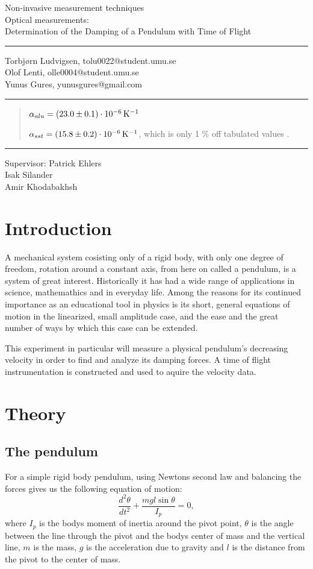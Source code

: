 \documentclass[11pt, a4paper]{article}
\date{\todayswe}
\makeatletter
\def\contacts{Torbjørn Ludvigsen, tolu0022@student.umu.se\\Olof Lenti, olle0004@student.umu.se\\
Yunus Gures, yunusgures@gmail.com}
\def\course{Non-invasive measurement techniques}
\def\lab{Optical measurements:\\Determination of the Damping of a Pendulum with Time of Flight}
\def\supervisors{Patrick Ehlers\\Isak Silander\\ Amir Khodabakhsh}
\makeatother
\begin{document}
\pagestyle{fancy}
\begin{titlepage}
	\begin{center}
		\course\\
		\Large{\lab}\vspace{2mm}
		\hrule\vspace{2mm}
		\tiny{\contacts}\vspace{2mm}
		\hrule
	\end{center}
	\vspace{4mm}

	\begin{abstract}

  $\alpha_{alu} =\unit[(23.0 \pm 0.1)\cdot10^{-6}]{K^{-1}}$ 

  $\alpha_{sst} = \unit[(15.8 \pm 0.2)\cdot10^{-6}]{K^{-1}}$, 
    which is only 1 \% off tabulated values \cite{ph, thex}.

	\end{abstract}
	\vfill
	\hrule\vspace{2mm}
	\centering
		\tiny{Supervisor: \supervisors}
\end{titlepage}

\pagestyle{plain}
\vspace{2cm}
\section{Introduction}
A mechanical system cosisting only of a rigid body, with only one degree of 
freedom, rotation around a constant axis, from here on called a pendulum, is 
a system of great interest. Historically it has had a wide range of
applications in science, mathemathics and in everyday life. Among the reasons for
its continued importance as an educational tool in physics is its short, general 
equations of
motion in the linearized, small amplitude case, and the ease and the great number 
of ways by which this case can be extended.

This experiment in particular will measure a physical pendulum's decreasing velocity
in order to find and analyze its damping forces. A time of flight instrumentation
is constructed and used to aquire the velocity data.

\section{Theory}
\subsection{The pendulum}
For a simple rigid body pendulum, using Newtons second law and balancing the
forces gives us the following
equation of motion:
\begin{equation}
  \frac{d^2\theta}{dt^2} + \frac{mgl\sin{\theta}}{I_p} = 0,
  \label{eq_of_motion}
\end{equation}
where $I_p$ is the bodys moment of inertia around the pivot point, $\theta$ is the
angle between the line through the pivot and the bodys center of mass and the
vertical line, $m$ is the mass, $g$ is the acceleration due to gravity and
$l$ is the distance from the pivot to the center of mass.
\end{document}

